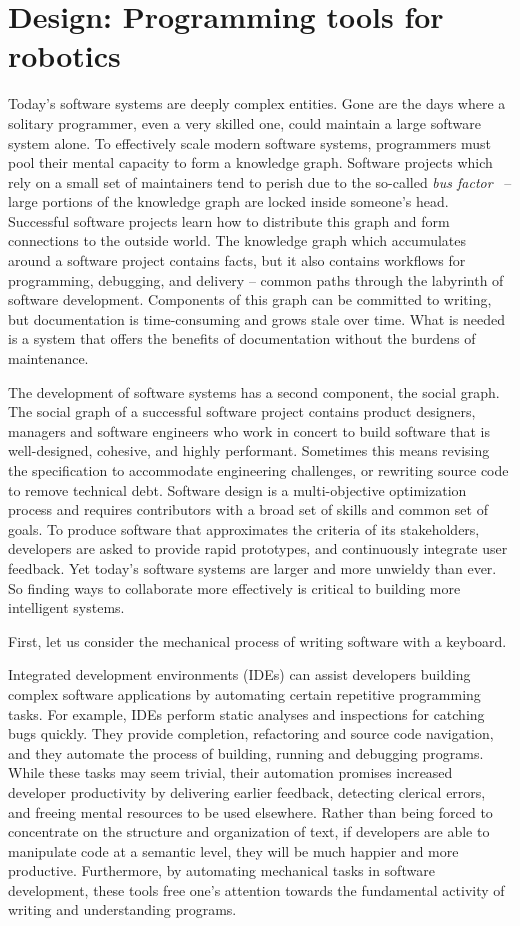 \section{Design: Programming tools for robotics}

Today's software systems are deeply complex entities. Gone are the days where a solitary programmer, even a very skilled one, could maintain a large software system alone. To effectively scale modern software systems, programmers must pool their mental capacity to form a knowledge graph. Software projects which rely on a small set of maintainers tend to perish due to the so-called \textit{bus factor}~\citep{cosentino2015assessing} -- large portions of the knowledge graph are locked inside someone's head. Successful software projects learn how to distribute this graph and form connections to the outside world. The knowledge graph which accumulates around a software project contains facts, but it also contains workflows for programming, debugging, and delivery -- common paths through the labyrinth of software development. Components of this graph can be committed to writing, but documentation is time-consuming and grows stale over time. What is needed is a system that offers the benefits of documentation without the burdens of maintenance.

The development of software systems has a second component, the social graph. The social graph of a successful software project contains product designers, managers and software engineers who work in concert to build software that is well-designed, cohesive, and highly performant. Sometimes this means revising the specification to accommodate engineering challenges, or rewriting source code to remove technical debt. Software design is a multi-objective optimization process and requires contributors with a broad set of skills and common set of goals. To produce software that approximates the criteria of its stakeholders, developers are asked to provide rapid prototypes, and continuously integrate user feedback. Yet today's software systems are larger and more unwieldy than ever. So finding ways to collaborate more effectively is critical to building more intelligent systems.

First, let us consider the mechanical process of writing software with a keyboard.

Integrated development environments (IDEs) can assist developers building complex software applications by automating certain repetitive programming tasks. For example, IDEs perform static analyses and inspections for catching bugs quickly. They provide completion, refactoring and source code navigation, and they automate the process of building, running and debugging programs. While these tasks may seem trivial, their automation promises increased developer productivity by delivering earlier feedback, detecting clerical errors, and freeing mental resources to be used elsewhere. Rather than being forced to concentrate on the structure and organization of text, if developers are able to manipulate code at a semantic level, they will be much happier and more productive. Furthermore, by automating mechanical tasks in software development, these tools free one's attention towards the fundamental activity of writing and understanding programs.

